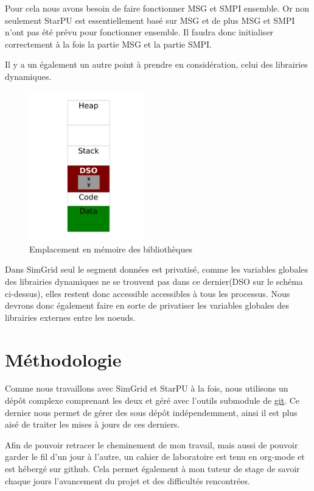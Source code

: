 \documentclass[smallextended]{svjour3}
\begin{document}
Pour cela nous avons besoin de faire fonctionner MSG et SMPI
ensemble. Or non seulement StarPU est essentiellement basé sur MSG
et de plus MSG et SMPI n'ont pas été prévu pour fonctionner
ensemble. Il faudra donc initialiser correctement à la fois la
partie MSG et la partie SMPI. 

Il y a un également un autre point à prendre en considération,
celui des librairies dynamiques. 

\begin{figure}[htb]
\centering
\includegraphics[width=5cm]{./Img/Dyn.pdf}
\caption{\label{fig:2}Emplacement en mémoire des bibliothèques}
\end{figure}

Dans SimGrid seul le segment données est privatisé, comme les
variables globales des librairies dynamiques ne se trouvent pas
dans ce dernier(DSO sur le schéma ci-dessus), elles restent donc
accessible accessibles à tous les processus. Nous devrons donc
également faire en sorte de privatiser les variables globales des
librairies externes entre les noeuds. 

\section{Méthodologie}
\label{sec-4}
Comme nous travaillons avec SimGrid et StarPU à la fois, nous
utilisons un dépôt complexe comprenant les deux et géré avec
l'outils submodule de \href{https://github.com/swhatelse/Journal}{git}. Ce dernier nous permet de gérer des sous
dépôt indépendemment, ainsi il est plus aisé de traiter les mises à
jours de ces derniers.

Afin de pouvoir retracer le cheminement de mon travail, mais aussi
de pouvoir garder le fil d'un jour à l'autre, un cahier de
laboratoire est tenu en org-mode et est hébergé sur github. Cela permet
également à mon tuteur de stage de savoir chaque jours l'avancement
du projet et des difficultés rencontrées.
\end{document}
